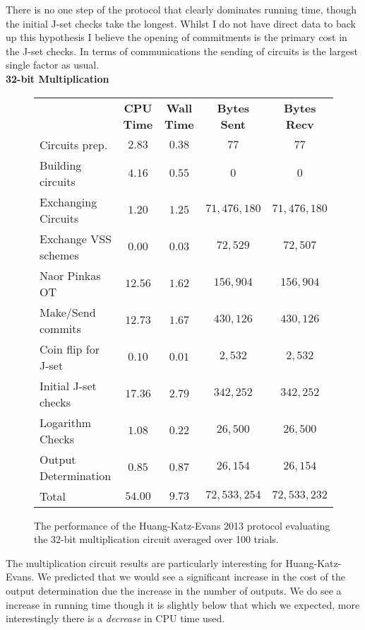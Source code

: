 \documentclass[ %
                    author={Nicholas Tutte},
                supervisor={Prof. Nigel Smart},
                    degree={MEng},
                     title={Secure Two Party Computation},
                  subtitle={A practical comparison of recent protocols},
                      type={Research - GG1K},
                      year={2015} ]{dissertation}
\begin{document}
				There is no one step of the protocol that clearly dominates running time, though the initial J-set checks take the longest. Whilst I do not have direct data to back up this hypothesis I believe the opening of commitments is the primary cost in the J-set checks. In terms of communications the sending of circuits is the largest single factor as usual.\\

				\FloatBarrier
				\noindent \textbf{32-bit Multiplication}
				\begin{figure}[!ht]
					\begin{tabular}{| p{4.3cm} | c c c c |}
						\hline
						 & \textbf{CPU Time} & \textbf{Wall Time} & \textbf{Bytes Sent} & \textbf{Bytes Recv} \\
						\thickhline
						Circuits prep. & $2.83$ & $0.38$ & $77$ & $77$ \\
						\hline
						Building circuits & $4.16$ & $0.55$ & $0$ & $0$ \\
						\hline
						Exchanging Circuits & $1.20$ & $1.25$ & $71,476,180$ & $71,476,180$ \\
						\hline
						Exchange VSS schemes & $0.00$ & $0.03$ & $72,529$ & $72,507$ \\
						\hline
						Naor Pinkas OT & $12.56$ & $1.62$ & $156,904$ & $156,904$ \\
						\hline
						Make/Send commits & $12.73$ & $1.67$ & $430,126$ & $430,126$ \\
						\hline
						Coin flip for J-set & $0.10$ & $0.01$ & $2,532$ & $2,532$ \\
						\hline
						Initial J-set checks & $17.36$ & $2.79$ & $342,252$ & $342,252$ \\
						\hline
						Logarithm Checks & $1.08$ & $0.22$ & $26,500$ & $26,500$ \\
						\hline
						Output Determination & $0.85$ & $0.87$ & $26,154$ & $26,154$ \\
						\thickhline
						Total & $54.00$ & $9.73$ & $72,533,254$ & $72,533,232$ \\
						\hline
					\end{tabular}
					\caption{The performance of the Huang-Katz-Evans 2013 protocol evaluating the 32-bit multiplication circuit averaged over 100 trials.\label{table:HKE_2013_Mul}}
				\end{figure}

				The multiplication circuit results are particularly interesting for Huang-Katz-Evans. We predicted that we would see a significant increase in the cost of the output determination due the increase in the number of outputs. We do see a increase in running time though it is slightly below that which we expected, more interestingly there is a \emph{decrease} in CPU time used.\\
\end{document}
